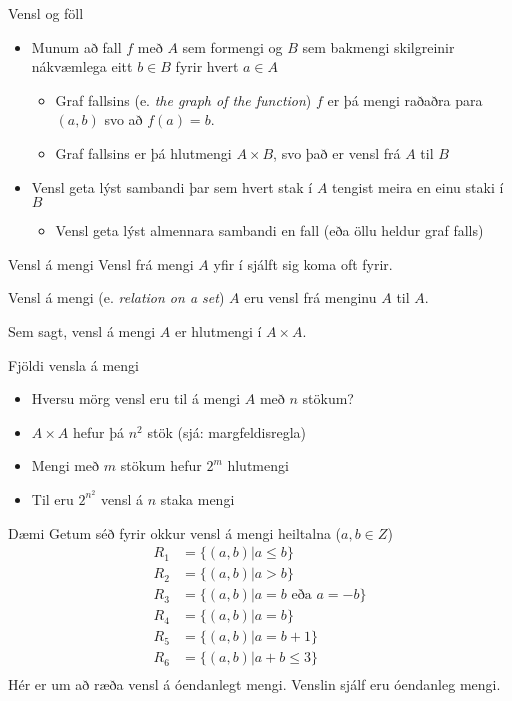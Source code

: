 \documentclass[handout]{beamer}
\begin{document}
\begin{frame}{Vensl og föll}
\begin{itemize}
 \item Munum að fall $f$ með $A$ sem formengi og $B$ sem bakmengi skilgreinir nákvæmlega eitt $b \in B$ fyrir hvert $a \in A$
 \begin{itemize}
  \item Graf fallsins (e. \emph{the graph of the function}) $f$ er þá mengi raðaðra para $(a, b)$ svo að $f(a) = b$.
  \item Graf fallsins er þá hlutmengi $A\times B$, svo það er vensl frá $A$ til $B$
 \end{itemize}
 \item Vensl geta lýst sambandi þar sem hvert stak í $A$ tengist meira en einu staki í $B$
 \begin{itemize}
  \item Vensl geta lýst almennara sambandi en fall (eða öllu heldur graf falls)
\end{itemize}
\end{itemize}
\end{frame}

\begin{frame}{Vensl á mengi}
Vensl frá mengi $A$ yfir í sjálft sig koma oft fyrir.

\begin{tcolorbox}[title=Vensl á mengi]
Vensl á mengi (e. \emph{relation on a set}) $A$ eru vensl frá menginu $A$ til $A$. 
\end{tcolorbox}

Sem sagt, vensl á mengi $A$ er hlutmengi í $A \times A$.
\end{frame}

\begin{frame}{Fjöldi vensla á mengi}
    \begin{itemize}
        \item Hversu mörg vensl eru til á mengi $A$ með $n$ stökum?\pause
        \item $A \times A$ hefur þá $n^2$ stök (sjá: margfeldisregla) \pause
        \item Mengi með $m$ stökum hefur $2^m$ hlutmengi \pause
        \item Til eru $2^{n^2}$ vensl á $n$ staka mengi
    \end{itemize}
\end{frame}

\begin{frame}{Dæmi}
Getum séð fyrir okkur vensl á mengi heiltalna ($a, b \in Z$)
\begin{align*}
R_1 &= \{(a, b)|a \leq b\}\\
R_2 &= \{(a, b)|a > b\}\\
R_3 &= \{(a, b)|a = b \text{ eða } a = -b\}\\
R_4 &= \{(a, b)|a = b\}\\
R_5 &= \{(a, b)|a = b+1\}\\
R_6 &= \{(a, b)|a+b \leq 3\}\\
\end{align*}
Hér er um að ræða vensl á óendanlegt mengi. Venslin sjálf eru óendanleg mengi.
\end{frame}
\end{document}

